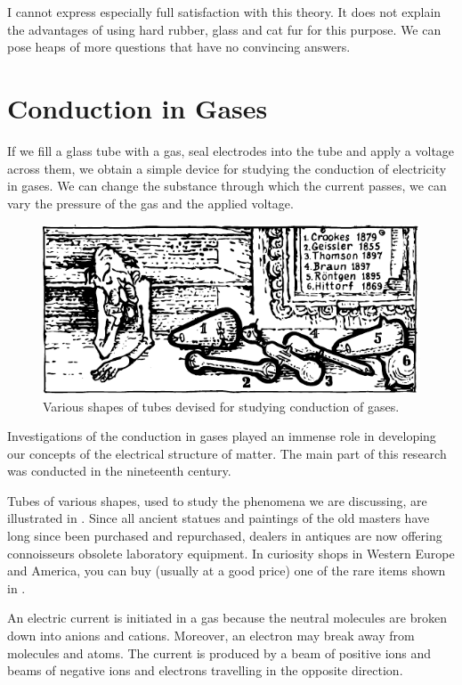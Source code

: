 I cannot express especially full satisfaction with this theory. It does not explain the advantages of using hard rubber, glass and cat fur for this purpose. We can pose heaps of more questions that have no convincing answers.

\section{Conduction in Gases}

If we fill a glass tube with a gas, seal electrodes into the tube and apply a voltage across them, we obtain a simple device for studying the conduction of electricity in gases. We can change the substance through which the current passes, we can vary the pressure of the gas and the applied voltage.

\begin{figure}[!ht]
\centering
\includegraphics[width=\textwidth]{figures/fig-02-06.pdf}
\caption{Various shapes of tubes devised for studying conduction of gases.}
\label{fig-2.6}
\end{figure}

Investigations of the conduction in gases played an immense role in developing our concepts of the electrical structure of matter. The main part of this research was conducted in the nineteenth century.

Tubes of various shapes, used to study the phenomena we are discussing, are illustrated in . Since all ancient statues and paintings of the old masters have long since been purchased and repurchased, dealers in antiques are now offering connoisseurs obsolete laboratory equipment. In curiosity shops in Western Europe and America, you can buy (usually at a good price) one of the rare items shown in .

An electric current is initiated in a gas because the neutral molecules are broken down into anions and cations. Moreover, an electron may break away from molecules and atoms. The current is produced by a beam of positive ions and beams of negative ions and electrons travelling in the opposite direction.

